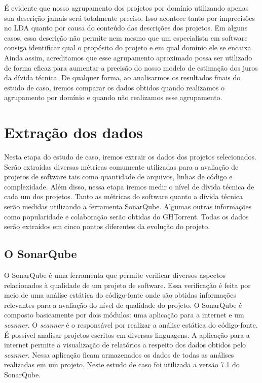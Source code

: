  
 É evidente que nosso agrupamento dos projetos por domínio utilizando apenas sua descrição jamais será totalmente preciso. Isso acontece tanto por imprecisões no LDA quanto por causa do conteúdo das descrições dos projetos. Em alguns casos, essa descrição não permite nem mesmo que um especialista em software consiga identificar qual o propósito do projeto e em qual domínio ele se encaixa. Ainda assim, acreditamos que esse agrupamento aproximado possa ser utilizado de forma eficaz para aumentar a precisão do nosso modelo de estimação dos juros da dívida técnica. De qualquer forma, ao analisarmos os resultados finais do estudo de caso, iremos comparar os dados obtidos quando realizamos o agrupamento por domínio e quando não realizamos esse agrupamento. 



\section{Extração dos dados}


Nesta etapa do estudo de caso, iremos extrair os dados dos projetos selecionados. Serão extraídas diversas métricas comumente utilizadas para a avaliação de projetos de software tais como quantidade de arquivos, linhas de código e complexidade. Além disso, nessa etapa iremos medir o nível de dívida técnica de cada um dos projetos.  Tanto as métricas do software quanto a dívida técnica serão medidas utilizando a ferramenta SonarQube\cite{campbell2013sonarqube}. Algumas outras informações como popularidade e colaboração serão obtidas do GHTorrent. Todas os dados serão extraídos em cinco pontos diferentes da evolução do projeto. 


\subsection{O SonarQube}

O SonarQube é uma ferramenta que permite verificar diversos aspectos relacionados à qualidade de um projeto de software. Essa verificação é feita por meio de uma análise estática do código-fonte onde são obtidas informações relevantes para a avaliação do nível de qualidade do projeto. O SonarQube é composto basicamente por dois módulos: uma aplicação para a internet e um \textit{scanner}. O \textit{scanner} é o responsável por realizar a análise estática do código-fonte. É possível analisar projetos escritos em diversas linguagens. A aplicação para a internet permite a visualização de relatórios a respeito dos dados obtidos pelo \textit{scanner}. Nessa aplicação ficam armazenados os dados de todas as análises realizadas em um projeto. Neste estudo de caso foi utilizada a versão 7.1 do SonarQube. 

